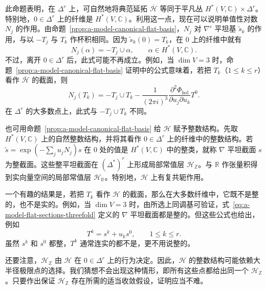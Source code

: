 此命题表明，在 $\Delta^r$ 上，可自然地将典范延拓 $\overline{\mathcal H}$ 等同于平凡丛 $H^*(V,\mathbb C)\times\Delta^r$。特别地，$0\in\Delta^r$ 上的纤维是 $H^*(V,\mathbb C)$。利用这一点，现在可以说明单值性对数 $N_j$ 的作用。由命题~\ref{prop:a-model-canonical-flat-basis}，$N_j$ 对 $\nabla^c$ 平坦基 $\widetilde s_k$ 的作用，与以 $-T_j$ 与 $T_k$ 作杯积相同。因为 $\widetilde s_k(0)=T_k$，在 $0$ 上的纤维中就有
\begin{equation}\label{eq:a-model-monodromy-boundary-cup}
N_j(\alpha)=-T_j\cup\alpha,\qquad\alpha\in H^*(V,\mathbb C).
\end{equation}
不过，离开 $0\in\Delta^r$ 后，此式可能不再成立。例如，当 $\dim V=3$ 时，命题~\ref{prop:a-model-canonical-flat-basis} 证明中的公式意味着，若把 $T_k$（$1\le k\le r$）看作 $\overline{\mathcal H}$ 的截面，则
\[
N_j(T_k)=-T_j\cup T_k-\frac1{(2\pi i)^3}\frac{\partial^2\Phi_{\mathrm{hol}}}{\partial u_j\partial u_k}T^0.
\]
在 $\Delta^r$ 的大多数点上，此式与 $-T_j\cup T_k$ 不同。

也可用命题~\ref{prop:a-model-canonical-flat-basis} 给 $\mathcal H$ 赋予整数结构。先取 $H^*(V,\mathbb C)$ 上的自然整数结构，并将其看作 $0\in\Delta^r$ 上的纤维中的整数结构。若 $\widetilde s=\exp(-\sum_ju_jN_j)s$ 在 $0$ 处的值是 $H^*(V,\mathbb C)$ 中的整类，就称 $\nabla$ 平坦截面 $s$ 为整截面。这些整平坦截面在 $(\Delta^*)^r$ 上形成局部常值层 $\mathcal H_{\mathbb Z}$。与 $\mathbb R$ 作张量积得到实向量空间的局部常值层 $\mathcal H_{\mathbb R}$。特别地，$\mathcal H$ 上有复共轭作用。

一个有趣的结果是，若把 $T_k$ 看作 $\mathcal H$ 的截面，那么在大多数纤维中，它既不是整的，也不是实的。例如，当 $\dim V=3$ 时，由所选上同调基可验证，式~\eqref{eq:a-model-flat-sections-threefold} 定义的 $\nabla$ 平坦截面都是整的。但这些公式也给出，例如
\[
T^k=s^k+u_ks^0,\qquad1\le k\le r.
\]
虽然 $s^k$ 和 $s^0$ 都整，$T^k$ 通常连实的都不是，更不用说整的。

还要注意，$\mathcal H_{\mathbb Z}$ 由 $\mathcal H$ 在 $0\in\Delta^r$ 上的行为决定。因此，$\mathcal H$ 的整数结构可能依赖大半径极限点的选择。我们猜想不会出现这种情形，即所有这些点都给出同一个 $\mathcal H_{\mathbb Z}$。只要作出保证 $\mathcal H_{\mathbb Z}$ 存在所需的适当收敛假设，证明应当不难。

